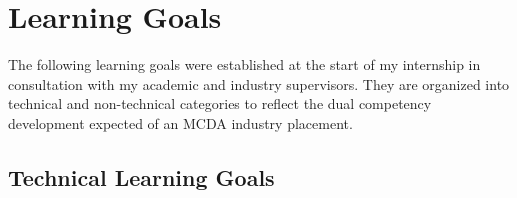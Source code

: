 
\chapter{Learning Goals}
\label{chap:learning_goals}

The following learning goals were established at the start of my internship
in consultation with my academic and industry supervisors. They are organized
into technical and non-technical categories to reflect the dual competency
development expected of an MCDA industry placement.

\section{Technical Learning Goals}

